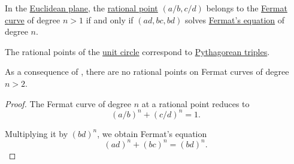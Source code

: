 \begin{proposition}\label{thm:fermat_curve_rational_points_via_fermat_triples}
  In the \hyperref[def:euclidean_space]{Euclidean plane}, the \hyperref[def:rational_point]{rational point} \( (a / b, c / d) \) belongs to the \hyperref[def:fermat_curve]{Fermat curve} of degree \( n > 1 \) if and only if \( (ad, bc, bd) \) solves \hyperref[def:fermats_equation]{Fermat's equation} of degree \( n \).
\end{proposition}
\begin{comments}
  \item The rational points of the \hyperref[def:circle]{unit circle} correspond to \hyperref[def:pythagorean_triple]{Pythagorean triples}.
  \item As a consequence of , there are no rational points on Fermat curves of degree \( n > 2 \).
\end{comments}
\begin{proof}
  The Fermat curve of degree \( n \) at a rational point reduces to
  \begin{equation*}
    (a / b)^n + (c / d)^n = 1.
  \end{equation*}

  Multiplying it by \( (bd)^n \), we obtain Fermat's equation
  \begin{equation*}
    (ad)^n + (bc)^n = (bd)^n.
  \end{equation*}
\end{proof}
